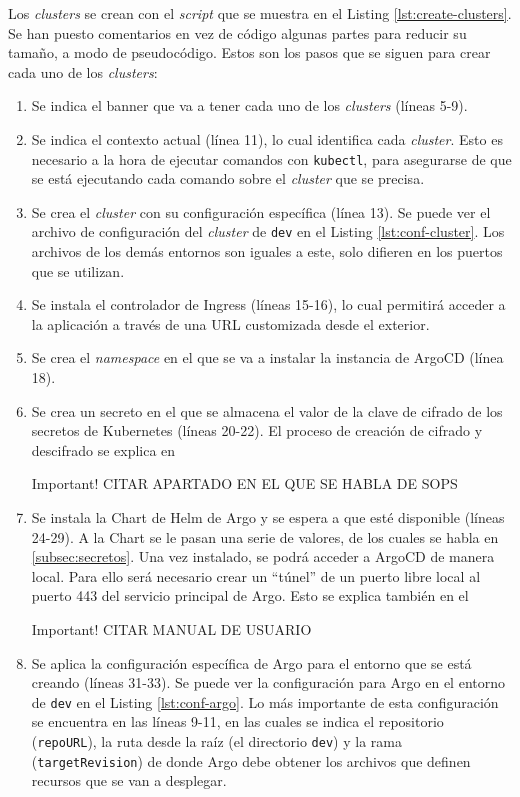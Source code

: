 Los \textit{clusters} se crean con el \textit{script} que se muestra en el Listing \ref{lst:create-clusters}. Se han puesto comentarios en vez de código algunas partes para reducir su tamaño, a modo de pseudocódigo. Estos son los pasos que se siguen para crear cada uno de los \textit{clusters}:

\begin{enumerate}
  \item Se indica el banner que va a tener cada uno de los \textit{clusters} (líneas 5-9).
  \item Se indica el contexto actual (línea 11), lo cual identifica cada \textit{cluster}. Esto es necesario a la hora de ejecutar comandos con \texttt{kubectl}, para asegurarse de que se está ejecutando cada comando sobre el \textit{cluster} que se precisa.
  \item Se crea el \textit{cluster} con su configuración específica (línea 13). Se puede ver el archivo de configuración del \textit{cluster} de \texttt{dev} en el Listing \ref{lst:conf-cluster}. Los archivos de los demás entornos son iguales a este, solo difieren en los puertos que se utilizan.
  \item Se instala el controlador de Ingress (líneas 15-16), lo cual permitirá acceder a la aplicación a través de una URL customizada desde el exterior.
  \item Se crea el \textit{namespace} en el que se va a instalar la instancia de ArgoCD (línea 18).
  \item Se crea un secreto en el que se almacena el valor de la clave de cifrado de los secretos de Kubernetes (líneas 20-22). El proceso de creación de cifrado y descifrado se explica en
    \begin{bclogo}[logo=\bcattention]{Important!}
      CITAR APARTADO EN EL QUE SE HABLA DE SOPS
    \end{bclogo}
  \item Se instala la Chart de Helm de Argo y se espera a que esté disponible (líneas 24-29). A la Chart se le pasan una serie de valores, de los cuales se habla en \ref{subsec:secretos}. Una vez instalado, se podrá acceder a ArgoCD de manera local. Para ello será necesario crear un ``túnel'' de un puerto libre local al puerto 443 del servicio principal de Argo. Esto se explica también en el
    \begin{bclogo}[logo=\bcattention]{Important!}
      CITAR MANUAL DE USUARIO
    \end{bclogo}
  \item Se aplica la configuración específica de Argo para el entorno que se está creando (líneas 31-33). Se puede ver la configuración para Argo en el entorno de \texttt{dev} en el Listing \ref{lst:conf-argo}. Lo más importante de esta configuración se encuentra en las líneas 9-11, en las cuales se indica el repositorio (\texttt{repoURL}), la ruta desde la raíz (el directorio \texttt{dev}) y la rama (\texttt{targetRevision}) de donde Argo debe obtener los archivos que definen recursos que se van a desplegar.

\end{enumerate}
